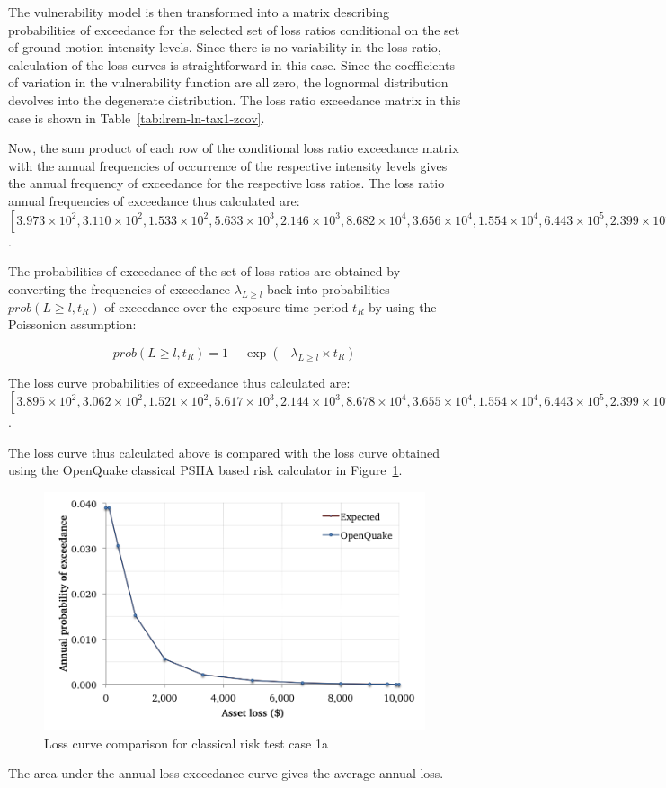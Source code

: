 The vulnerability model is then transformed into a matrix describing probabilities of exceedance for the selected set of loss ratios conditional on the set of ground motion intensity levels. Since there is no variability in the loss ratio, calculation of the loss curves is straightforward in this case. Since the coefficients of variation in the vulnerability function are all zero, the lognormal distribution devolves into the degenerate distribution. The loss ratio exceedance matrix in this case is shown in Table~\ref{tab:lrem-ln-tax1-zcov}.



Now, the sum product of each row of the conditional loss ratio exceedance matrix with the annual frequencies of occurrence of the respective intensity levels gives the annual frequency of exceedance for the respective loss ratios. The loss ratio annual frequencies of exceedance thus calculated are: $[3.973\times10^{2}, 3.110\times10^{2}, 1.533\times10^{2}, 5.633\times10^{3}, 2.146\times10^{3}, 8.682\times10^{4}, 3.656\times10^{4}, 1.554\times10^{4}, 6.443\times10^{5}, 2.399\times10^{5}]$.

The probabilities of exceedance of the set of loss ratios are obtained by converting the frequencies of exceedance  $\lambda_{L \geq l}$ back into probabilities $prob(L \geq l, t_R)$ of exceedance over the exposure time period $t_R$ by using the Poissonion assumption:

\begin{equation}
	prob(L \geq l, t_R) = 1 - \exp (-\lambda_{L \geq l} \times t_R)
\end{equation}

The loss curve probabilities of exceedance thus calculated are: $[3.895\times10^{2}, 3.062\times10^{2}, 1.521\times10^{2}, 5.617\times10^{3}, 2.144\times10^{3}, 8.678\times10^{4}, 3.655\times10^{4}, 1.554\times10^{4}, 6.443\times10^{5}, 2.399\times10^{5}, 5.683\times10^{6}]$.

The loss curve thus calculated above is compared with the loss curve obtained using the OpenQuake classical PSHA based risk calculator in Figure~\ref{fig:lc-cr-1a}.

\begin{figure}[htbp]
\centering
\includegraphics[width=12cm]{qareport/figures/fig-lc-cr-1a}
\caption{Loss curve comparison for classical risk test case 1a}
\label{fig:lc-cr-1a}
\end{figure}

The area under the annual loss exceedance curve gives the average annual loss.

